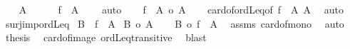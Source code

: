 \begin{isabellebody}
\ \ \isamarkupfalse%
\ {\isachardoublequoteopen}A\ {\isasymnoteq}\ {\isacharbraceleft}{\kern0pt}{\isacharbraceright}{\kern0pt}{\isachardoublequoteclose}\isanewline
\ \ \isamarkupfalse%
\ {\isachardoublequoteopen}f\ {\isacharbackquote}{\kern0pt}\ A\ {\isasymnoteq}\ {\isacharbraceleft}{\kern0pt}{\isacharbraceright}{\kern0pt}{\isachardoublequoteclose}\ \isamarkupfalse%
\ auto\isanewline
\ \ \isamarkupfalse%
\ {\isachardoublequoteopen}{\isacharbar}{\kern0pt}f\ {\isacharbackquote}{\kern0pt}\ A{\isacharbar}{\kern0pt}\ {\isasymle}o\ {\isacharbar}{\kern0pt}A{\isacharbar}{\kern0pt}{\isachardoublequoteclose}\isanewline
\ \ \isamarkupfalse%
\ card{\isacharunderscore}{\kern0pt}of{\isacharunderscore}{\kern0pt}ordLeq{}{\isacharbrackleft}{\kern0pt}of\ {\isachardoublequoteopen}f\ {\isacharbackquote}{\kern0pt}\ A{\isachardoublequoteclose}\ A{\isacharbrackright}{\kern0pt}\ \isamarkupfalse%
\ auto\isanewline
{}\isamarkupfalse%
%
\endisatagproof
{\isafoldproof}%
%
\isadelimproof
\isanewline
%
\endisadelimproof
\isanewline
{}\isamarkupfalse%
\ surj{\isacharunderscore}{\kern0pt}imp{\isacharunderscore}{\kern0pt}ordLeq{\isacharcolon}{\kern0pt}\isanewline
{}\ {\isachardoublequoteopen}B\ {\isasymsubseteq}\ f\ {\isacharbackquote}{\kern0pt}\ A{\isachardoublequoteclose}\isanewline
{}\ {\isachardoublequoteopen}{\isacharbar}{\kern0pt}B{\isacharbar}{\kern0pt}\ {\isasymle}o\ {\isacharbar}{\kern0pt}A{\isacharbar}{\kern0pt}{\isachardoublequoteclose}\isanewline
%
\isadelimproof
%
\endisadelimproof
%
\isatagproof
{}\isamarkupfalse%
{\isacharminus}{\kern0pt}\isanewline
\ \ \isamarkupfalse%
\ {\isachardoublequoteopen}{\isacharbar}{\kern0pt}B{\isacharbar}{\kern0pt}\ {\isacharless}{\kern0pt}{\isacharequal}{\kern0pt}o\ {\isacharbar}{\kern0pt}f\ {\isacharbackquote}{\kern0pt}\ A{\isacharbar}{\kern0pt}{\isachardoublequoteclose}\ \isamarkupfalse%
\ assms\ card{\isacharunderscore}{\kern0pt}of{\isacharunderscore}{\kern0pt}mono{}\ \isamarkupfalse%
\ auto\isanewline
\ \ \isamarkupfalse%
\ {\isacharquery}{\kern0pt}thesis\ \isamarkupfalse%
\ card{\isacharunderscore}{\kern0pt}of{\isacharunderscore}{\kern0pt}image\ ordLeq{\isacharunderscore}{\kern0pt}transitive\ \isamarkupfalse%
\ blast\isanewline
{}\isamarkupfalse%
%
\endisatagproof
{\isafoldproof}%
%
\isadelimproof
\isanewline
%
\endisadelimproof

\end{isabellebody}
